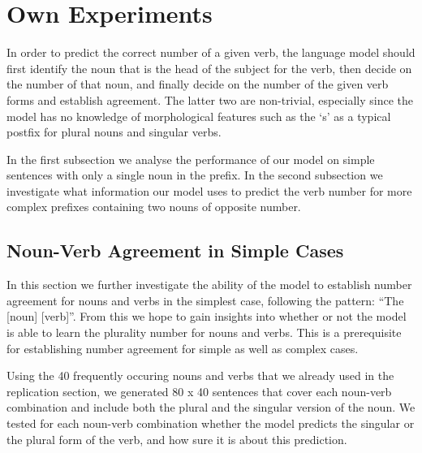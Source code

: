 \section{Own Experiments}
\label{own-experiments}
In order to predict the correct number of a given verb,
the language model should first
identify the noun that is the head of the subject for the verb,
then decide on the number of that noun,
and finally decide on the number of the given verb forms and
establish agreement.
The latter two are non-trivial, especially since the model has no knowledge
of morphological features such as the `s' as a typical postfix
for plural nouns and singular verbs. 

In the first subsection we analyse
the performance of our model on simple  
sentences with only a single noun in the prefix.
%
In the second subsection we investigate 
what information our model uses to 
predict the verb number for more complex prefixes
containing two nouns of opposite number.


\subsection{Noun-Verb Agreement in Simple Cases}

In this section we further investigate the ability of the model to
establish number agreement for nouns and verbs in the simplest case,
following the pattern: ``The [noun] [verb]''. 
From this we hope to gain insights into whether or not the model is able 
to learn the plurality number for nouns and verbs.
This is a prerequisite for establishing number agreement
for simple as well as complex cases.

Using the 40 frequently occuring nouns and verbs that we already used in the replication section, we generated 80 x 40 sentences that cover each noun-verb combination and include both the plural and the singular version of the noun. 
We tested for each noun-verb combination whether the model 
predicts the singular or the plural form of the verb,
and how sure it is about this prediction.

